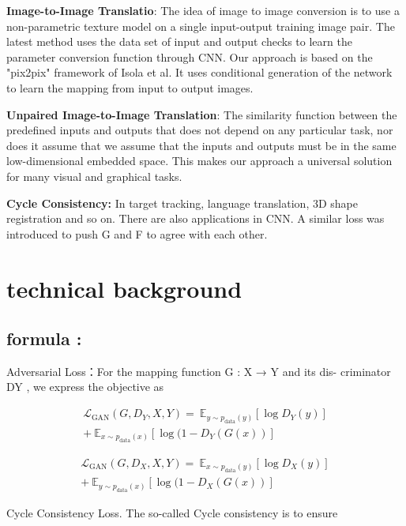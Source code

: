 \documentclass[10pt,twocolumn,letterpaper]{article}
\begin{document}
{\bf Image-to-Image Translatio}:
The idea of image to image conversion 
is to use a non-parametric texture model\cite{texmodel}
 on a single input-output training image pair. 
 The latest method uses the data set of 
 input and output checks to learn the 
 parameter conversion function through CNN\cite{CNN}. 
 Our approach is based on the "pix2pix"\cite{pix2pix} 
 framework of Isola et al\cite{Isola}.
 It uses conditional generation of the network 
 to learn the mapping from input to output images.
 
 {\bf Unpaired Image-to-Image Translation}:
 The similarity function between the predefined inputs 
and outputs that does not depend on any particular task, 
nor does it assume that we assume that the inputs 
and outputs must be in the same low-dimensional 
embedded space. This makes our approach a 
universal solution for many visual and graphical tasks.

{\bf Cycle Consistency:}
In target tracking, language translation, 
3D shape registration and so on. 
There are also applications in CNN. 
A similar loss was introduced to push G and F 
to agree with each other.



\section{technical background}
\subsection{formula :}

Adversarial Loss：For the mapping function G : X → Y and its dis- criminator DY , we express the objective as

\begin{align}
\mathcal{L}_{\text{GAN}}(G,D_Y,X,Y) =  \ \mathbb{E}_{y \sim p_{\text{data}}(y)}[\log D_Y(y)] \nonumber \\
+  \ \mathbb{E}_{x \sim p_{\text{data}}(x)}[\log (1-D_Y(G(x))]
\end{align}

\begin{align}
  \mathcal{L}_{\text{GAN}}(G,D_X,X,Y) =  \ \mathbb{E}_{x \sim p_{\text{data}}(y)}[\log D_X(y)] \nonumber \\
  +  \ \mathbb{E}_{y \sim p_{\text{data}}(x)}[\log (1-D_X(G(x))]
  \end{align}

  Cycle Consistency Loss. The so-called Cycle consistency is to ensure
  
\end{document}
